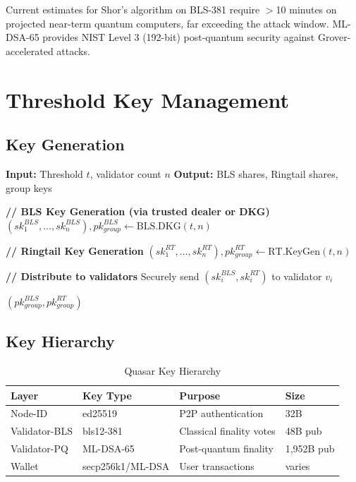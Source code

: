 \documentclass[11pt,a4paper]{article}
\begin{document}
Current estimates for Shor's algorithm on BLS-381 require $>$10 minutes on projected near-term quantum computers, far exceeding the attack window. ML-DSA-65 provides NIST Level 3 (192-bit) post-quantum security against Grover-accelerated attacks.

\section{Threshold Key Management}

\subsection{Key Generation}

\begin{algorithm}
\caption{Dual Threshold Key Generation}
\begin{algorithmic}[1]
\STATE \textbf{Input:} Threshold $t$, validator count $n$
\STATE \textbf{Output:} BLS shares, Ringtail shares, group keys

\STATE \textbf{// BLS Key Generation (via trusted dealer or DKG)}
\STATE $(sk_1^{BLS}, \ldots, sk_n^{BLS}), pk_{group}^{BLS} \gets \text{BLS.DKG}(t, n)$

\STATE \textbf{// Ringtail Key Generation}
\STATE $(sk_1^{RT}, \ldots, sk_n^{RT}), pk_{group}^{RT} \gets \text{RT.KeyGen}(t, n)$

\STATE \textbf{// Distribute to validators}
    \STATE Securely send $(sk_i^{BLS}, sk_i^{RT})$ to validator $v_i$
\ENDFOR

\RETURN $(pk_{group}^{BLS}, pk_{group}^{RT})$
\end{algorithmic}
\end{algorithm}

\subsection{Key Hierarchy}

\begin{table}[h]
\centering
\caption{Quasar Key Hierarchy}
\begin{tabular}{@{}llll@{}}
\toprule
Layer & Key Type & Purpose & Size \\
\midrule
Node-ID & ed25519 & P2P authentication & 32B \\
Validator-BLS & bls12-381 & Classical finality votes & 48B pub \\
Validator-PQ & ML-DSA-65 & Post-quantum finality & 1,952B pub \\
Wallet & secp256k1/ML-DSA & User transactions & varies \\
\bottomrule
\end{tabular}
\end{table}
\end{document}
